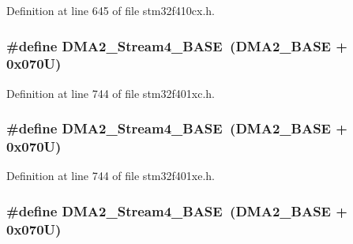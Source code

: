 Definition at line 645 of file stm32f410cx.\+h.

\subsubsection[{\texorpdfstring{D\+M\+A2\+\_\+\+Stream4\+\_\+\+B\+A\+SE}{DMA2_Stream4_BASE}}]{\setlength{\rightskip}{0pt plus 5cm}\#define D\+M\+A2\+\_\+\+Stream4\+\_\+\+B\+A\+SE~({\bf D\+M\+A2\+\_\+\+B\+A\+SE} + 0x070\+U)}\hypertarget{group___peripheral__registers__structures_gad1e67740e6301233473f64638145dd1f}{}\label{group___peripheral__registers__structures_gad1e67740e6301233473f64638145dd1f}


Definition at line 744 of file stm32f401xc.\+h.

\subsubsection[{\texorpdfstring{D\+M\+A2\+\_\+\+Stream4\+\_\+\+B\+A\+SE}{DMA2_Stream4_BASE}}]{\setlength{\rightskip}{0pt plus 5cm}\#define D\+M\+A2\+\_\+\+Stream4\+\_\+\+B\+A\+SE~({\bf D\+M\+A2\+\_\+\+B\+A\+SE} + 0x070\+U)}\hypertarget{group___peripheral__registers__structures_gad1e67740e6301233473f64638145dd1f}{}\label{group___peripheral__registers__structures_gad1e67740e6301233473f64638145dd1f}


Definition at line 744 of file stm32f401xe.\+h.

\subsubsection[{\texorpdfstring{D\+M\+A2\+\_\+\+Stream4\+\_\+\+B\+A\+SE}{DMA2_Stream4_BASE}}]{\setlength{\rightskip}{0pt plus 5cm}\#define D\+M\+A2\+\_\+\+Stream4\+\_\+\+B\+A\+SE~({\bf D\+M\+A2\+\_\+\+B\+A\+SE} + 0x070\+U)}\hypertarget{group___peripheral__registers__structures_gad1e67740e6301233473f64638145dd1f}{}\label{group___peripheral__registers__structures_gad1e67740e6301233473f64638145dd1f}


